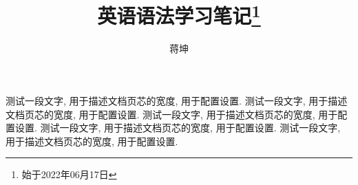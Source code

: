 \documentclass[10pt,UTF8]{ctexart}
\title{英语语法学习笔记\footnote{始于2022年06月17日}}
\author{蒋坤}
\begin{document}






测试一段文字, 用于描述文档页芯的宽度, 用于配置设置. 
测试一段文字, 用于描述文档页芯的宽度, 用于配置设置. 
测试一段文字, 用于描述文档页芯的宽度, 用于配置设置. 
测试一段文字, 用于描述文档页芯的宽度, 用于配置设置. 
测试一段文字, 用于描述文档页芯的宽度, 用于配置设置. 
\end{document}
